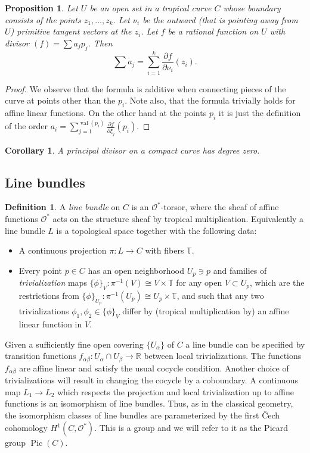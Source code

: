\documentclass[12pt]{amsart}
\theoremstyle{plain}
\newtheorem{proposition}[theorem]{Proposition}
\newtheorem{corollary}[theorem]{Corollary}
\theoremstyle{definition}
\newtheorem{definition}[theorem]{Definition}
\theoremstyle{remark}
\newcommand{\R}{\mathbb R}    %
\renewcommand{\O}{\mathcal O}   %
\newcommand{\<}{\langle}   %
\renewcommand{\>}{\rangle} %
\newcommand{\Pic}{\operatorname{Pic}}
\newcommand{\Rtr}{\mathbb T}
\newcommand{\val}{\operatorname{val}}
\begin{document}
\begin{proposition}\label{lemma:residue}
Let $U$ be an open set in a tropical curve $C$ whose boundary consists of the points $z_1,\dots,z_k$. Let $\nu_i$ be the outward (that is pointing away from $U$)
primitive tangent vectors at the $z_i$. Let $f$ be a rational function on $U$ with
divisor $(f)=\sum a_j p_j$. Then
\begin{equation}\label{eq:degree}
\sum a_j =\sum_{i=1}^k \frac{\partial f}{\partial \nu_i}(z_i).
\end{equation}
\end{proposition}
\begin{proof}
We observe that the formula is additive when connecting pieces of the curve at
points other than the $p_i$. Note also, that the formula trivially holds for
affine linear functions. On the other hand at the points $p_i$ it is just the
definition of the order $a_i=\sum_{j=1}^{\val(p_i)}\frac{\partial f}{\partial
\xi_j}(p_i)$.
\end{proof}

\begin{corollary}
A principal divisor on a compact curve has degree zero.
\end{corollary}


\subsection{Line bundles}
\begin{definition}
A {\em line bundle} on $C$ is an ${\mathcal O}^*$-torsor, where the sheaf of
affine functions ${\mathcal O}^*$ acts on the structure sheaf by tropical
multiplication. Equivalently a line bundle $L$ is a topological space together
with the following data:
\begin{itemize}
\item A continuous projection $\pi: L\to C$ with fibers $\Rtr$.
\item Every point $p\in C$ has an open neighborhood $U_p\ni p$ and families of
{\em trivialization} maps $\{\phi\}_V: \pi^{-1} (V)\cong V\times \Rtr$ for any
open $V\subset U_p$, which are the restrictions from  $\{\phi\}_{U_p}: \pi^{-1}
(U_p)\cong U_p\times \Rtr$, and such that any two trivializations
$\phi_1,\phi_2\in \{\phi\}_V$ differ by (tropical multiplication by) an affine
linear function in $V$.
\end{itemize}
\end{definition}

Given a sufficiently fine open covering $\{U_\alpha\}$ of $C$ a line bundle can
be specified by transition functions $f_{\alpha\beta}:U_\alpha\cap U_\beta \to
\R$ between local trivializations. The functions $f_{\alpha\beta}$ are affine linear
and satisfy the usual cocycle condition. Another choice of trivializations will
result in changing the cocycle by a coboundary. A continuous map $L_1\to L_2$
which respects the projection and local trivialization up to affine functions
is an isomorphism of line bundles. Thus, as in the classical geometry, the
isomorphism classes of line bundles are parameterized by the first \v{C}ech
cohomology $H^1(C,\O^*)$.  This is a group and we will refer to it as the
Picard group $\Pic(C)$.
\end{document}
